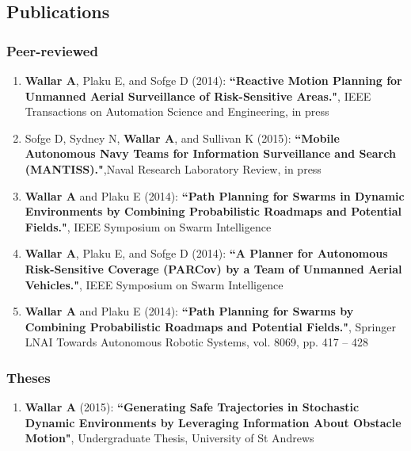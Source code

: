 \documentclass[line,margin]{cv}
\begin{document}
\begin{resume}
\section{Publications}

\subsubsection{Peer-reviewed}

\begin{enumerate}

    \item \textbf{Wallar A}, Plaku E, and Sofge D (2014):
        \textbf{``Reactive Motion Planning for Unmanned Aerial Surveillance
        of Risk-Sensitive Areas."}, IEEE Transactions on Automation Science
        and Engineering, in press

    \item Sofge D, Sydney N, \textbf{Wallar A}, and Sullivan K (2015):
        \textbf{``Mobile Autonomous Navy Teams for Information Surveillance
        and Search (MANTISS)."},Naval Research Laboratory Review, in press

    \item \textbf{Wallar A} and Plaku E (2014): \textbf{``Path Planning for
        Swarms in Dynamic Environments by Combining Probabilistic Roadmaps
        and Potential Fields."}, IEEE Symposium on Swarm Intelligence

    \item \textbf{Wallar A}, Plaku E, and Sofge D (2014): \textbf{``A Planner
        for Autonomous Risk-Sensitive Coverage (PARCov) by a Team of Unmanned
        Aerial Vehicles."}, IEEE Symposium on Swarm Intelligence

    \item \textbf{Wallar A} and Plaku E (2014): \textbf{``Path Planning for
        Swarms by Combining Probabilistic Roadmaps and Potential Fields."},
        Springer LNAI Towards Autonomous Robotic Systems, vol. 8069,
        pp. 417 -- 428

\end{enumerate}

\subsubsection{Theses}

\begin{enumerate}

    \item \textbf{Wallar A} (2015): \textbf{``Generating Safe Trajectories
        in Stochastic Dynamic Environments by Leveraging Information About
        Obstacle Motion"}, Undergraduate Thesis, University of St Andrews


\end{enumerate}
\end{resume}
\end{document}
